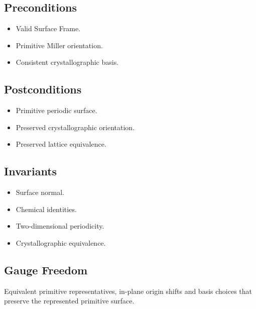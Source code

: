 \subsection{Preconditions}

\begin{itemize}
\item Valid Surface Frame.
\item Primitive Miller orientation.
\item Consistent crystallographic basis.
\end{itemize}

\subsection{Postconditions}

\begin{itemize}
\item Primitive periodic surface.
\item Preserved crystallographic orientation.
\item Preserved lattice equivalence.
\end{itemize}

\subsection{Invariants}

\begin{itemize}
\item Surface normal.
\item Chemical identities.
\item Two-dimensional periodicity.
\item Crystallographic equivalence.
\end{itemize}

\subsection{Gauge Freedom}

Equivalent primitive representatives, in-plane origin shifts and basis
choices that preserve the represented primitive surface.
